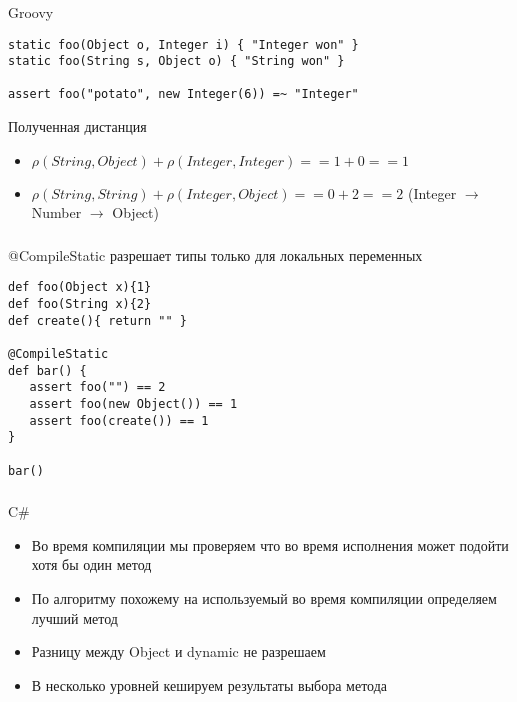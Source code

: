 \documentclass[t]{beamer}  %
\begin{document}
\begin{frame}[fragile]
	\frametitle{\insertsection} 
  	\framesubtitle{\insertsubsection}
    \begin{block}{Groovy}
		\begin{verbatim}
static foo(Object o, Integer i) { "Integer won" }
static foo(String s, Object o) { "String won" }

assert foo("potato", new Integer(6)) =~ "Integer"
		\end{verbatim}
	\end{block}
	\begin{block}{Полученная дистанция}
    \begin{itemize}
	    \item $\rho(String, Object) + \rho(Integer, Integer) == 1 + 0 == 1$
	    \item $\rho(String, String) + \rho(Integer, Object) == 0 + 2 == 2$ (Integer $\rightarrow$ Number $\rightarrow$ Object)
	\end{itemize}
    \end{block}
\end{frame}

\begin{frame}[fragile]
	\frametitle{\insertsection} 
  	\framesubtitle{\insertsubsection}
    \begin{block}{@CompileStatic разрешает типы только для локальных переменных}
	    \begin{verbatim}
def foo(Object x){1} 
def foo(String x){2} 
def create(){ return "" } 
 
@CompileStatic 
def bar() { 
   assert foo("") == 2 
   assert foo(new Object()) == 1 
   assert foo(create()) == 1 
} 
 
bar()
		\end{verbatim}
    \end{block}
\end{frame}

\begin{frame}[fragile]
	\frametitle{\insertsection} 
  	\framesubtitle{\insertsubsection}
    \begin{block}{C\#}
\begin{itemize}
\item Во время компиляции мы проверяем что во время исполнения может подойти хотя бы один метод
\item По алгоритму похожему на используемый во время компиляции определяем лучший метод
\item Разницу между Object и dynamic не разрешаем
\item В несколько уровней кешируем результаты выбора метода
\end{itemize}
    \end{block}
\end{frame}
\end{document}
